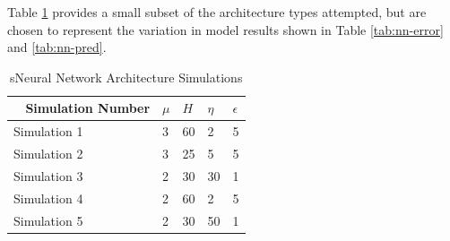 \documentclass[conference]{IEEEtran}
\begin{document}
{%



Table \ref{tab:nn-sims} provides a small subset of the architecture types attempted, but are chosen to represent the variation in model results shown in Table \ref{tab:nn-error} and \ref{tab:nn-pred}.
\begin{table}[H]
	\centering
    \begin{tabular}{|l|l|l|l|l|}
    \hline
    ~    \textbf{Simulation Number} & \textbf{$\mu$} & \textbf{$H$} & \textbf{$\eta$} & \textbf{$\epsilon$}\\ \hline
    	Simulation 1 						& 3 			& 60 		& 2 				& 5			\\ \hline
    	Simulation 2 						& 3 			& 25 		& 5 				& 5 		\\ \hline
    	Simulation 3 						& 2 			& 30 		& 30 				& 1 		\\ \hline
    	Simulation 4						& 2 			& 60 		& 2 				& 5 		\\ \hline    
    	Simulation 5 						& 2 			& 30 		& 50 				& 1 \\ \hline
    \end{tabular}
    \caption {sNeural Network Architecture Simulations}
    \label{tab:nn-sims}
\end{table}

}
\end{document}
